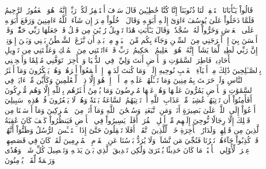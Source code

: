 قَالُواْ يَـٰٓأَبَانَا ٱسۡتَغۡفِرۡ لَنَا ذُنُوبَنَآ إِنَّا كُنَّا خَٰطِـِٔينَ
قَالَ سَوۡفَ أَسۡتَغۡفِرُ لَكُمۡ رَبِّيٓۖ إِنَّهُۥ هُوَ ٱلۡغَفُورُ ٱلرَّحِيمُ
فَلَمَّا دَخَلُواْ عَلَىٰ يُوسُفَ ءَاوَىٰٓ إِلَيۡهِ أَبَوَيۡهِ وَقَالَ ٱدۡخُلُواْ مِصۡرَ إِن شَآءَ ٱللَّهُ ءَامِنِينَ
وَرَفَعَ أَبَوَيۡهِ عَلَى ٱلۡعَرۡشِ وَخَرُّواْ لَهُۥ سُجَّدٗاۖ وَقَالَ يَـٰٓأَبَتِ هَٰذَا تَأۡوِيلُ رُءۡيَٰيَ مِن قَبۡلُ قَدۡ جَعَلَهَا رَبِّي حَقّٗاۖ وَقَدۡ أَحۡسَنَ بِيٓ إِذۡ أَخۡرَجَنِي مِنَ ٱلسِّجۡنِ وَجَآءَ بِكُم مِّنَ ٱلۡبَدۡوِ مِنۢ بَعۡدِ أَن نَّزَغَ ٱلشَّيۡطَٰنُ بَيۡنِي وَبَيۡنَ إِخۡوَتِيٓۚ إِنَّ رَبِّي لَطِيفٞ لِّمَا يَشَآءُۚ إِنَّهُۥ هُوَ ٱلۡعَلِيمُ ٱلۡحَكِيمُ
۞رَبِّ قَدۡ ءَاتَيۡتَنِي مِنَ ٱلۡمُلۡكِ وَعَلَّمۡتَنِي مِن تَأۡوِيلِ ٱلۡأَحَادِيثِۚ فَاطِرَ ٱلسَّمَٰوَٰتِ وَٱلۡأَرۡضِ أَنتَ وَلِيِّۦ فِي ٱلدُّنۡيَا وَٱلۡأٓخِرَةِۖ تَوَفَّنِي مُسۡلِمٗا وَأَلۡحِقۡنِي بِٱلصَّـٰلِحِينَ
ذَٰلِكَ مِنۡ أَنۢبَآءِ ٱلۡغَيۡبِ نُوحِيهِ إِلَيۡكَۖ وَمَا كُنتَ لَدَيۡهِمۡ إِذۡ أَجۡمَعُوٓاْ أَمۡرَهُمۡ وَهُمۡ يَمۡكُرُونَ
وَمَآ أَكۡثَرُ ٱلنَّاسِ وَلَوۡ حَرَصۡتَ بِمُؤۡمِنِينَ
وَمَا تَسۡـَٔلُهُمۡ عَلَيۡهِ مِنۡ أَجۡرٍۚ إِنۡ هُوَ إِلَّا ذِكۡرٞ لِّلۡعَٰلَمِينَ
وَكَأَيِّن مِّنۡ ءَايَةٖ فِي ٱلسَّمَٰوَٰتِ وَٱلۡأَرۡضِ يَمُرُّونَ عَلَيۡهَا وَهُمۡ عَنۡهَا مُعۡرِضُونَ
وَمَا يُؤۡمِنُ أَكۡثَرُهُم بِٱللَّهِ إِلَّا وَهُم مُّشۡرِكُونَ
أَفَأَمِنُوٓاْ أَن تَأۡتِيَهُمۡ غَٰشِيَةٞ مِّنۡ عَذَابِ ٱللَّهِ أَوۡ تَأۡتِيَهُمُ ٱلسَّاعَةُ بَغۡتَةٗ وَهُمۡ لَا يَشۡعُرُونَ
قُلۡ هَٰذِهِۦ سَبِيلِيٓ أَدۡعُوٓاْ إِلَى ٱللَّهِۚ عَلَىٰ بَصِيرَةٍ أَنَا۠ وَمَنِ ٱتَّبَعَنِيۖ وَسُبۡحَٰنَ ٱللَّهِ وَمَآ أَنَا۠ مِنَ ٱلۡمُشۡرِكِينَ
وَمَآ أَرۡسَلۡنَا مِن قَبۡلِكَ إِلَّا رِجَالٗا نُّوحِيٓ إِلَيۡهِم مِّنۡ أَهۡلِ ٱلۡقُرَىٰٓۗ أَفَلَمۡ يَسِيرُواْ فِي ٱلۡأَرۡضِ فَيَنظُرُواْ كَيۡفَ كَانَ عَٰقِبَةُ ٱلَّذِينَ مِن قَبۡلِهِمۡۗ وَلَدَارُ ٱلۡأٓخِرَةِ خَيۡرٞ لِّلَّذِينَ ٱتَّقَوۡاْۚ أَفَلَا تَعۡقِلُونَ
حَتَّىٰٓ إِذَا ٱسۡتَيۡـَٔسَ ٱلرُّسُلُ وَظَنُّوٓاْ أَنَّهُمۡ قَدۡ كُذِبُواْ جَآءَهُمۡ نَصۡرُنَا فَنُجِّيَ مَن نَّشَآءُۖ وَلَا يُرَدُّ بَأۡسُنَا عَنِ ٱلۡقَوۡمِ ٱلۡمُجۡرِمِينَ
لَقَدۡ كَانَ فِي قَصَصِهِمۡ عِبۡرَةٞ لِّأُوْلِي ٱلۡأَلۡبَٰبِۗ مَا كَانَ حَدِيثٗا يُفۡتَرَىٰ وَلَٰكِن تَصۡدِيقَ ٱلَّذِي بَيۡنَ يَدَيۡهِ وَتَفۡصِيلَ كُلِّ شَيۡءٖ وَهُدٗى وَرَحۡمَةٗ لِّقَوۡمٖ يُؤۡمِنُونَ